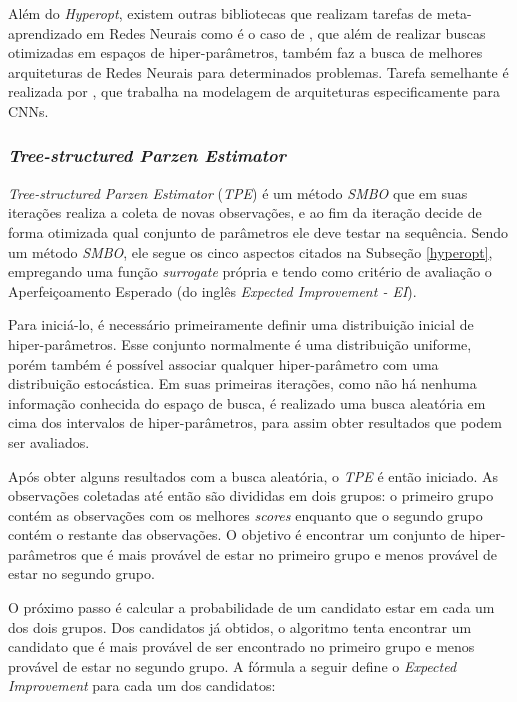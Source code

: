 \documentclass[
12pt,       %
openright,      %
oneside,      %
a4paper,      %
english,      %
french,       %
spanish,      %
brazil        %
]{abntex2}
\begin{document}
Além do \textit{Hyperopt}, existem outras bibliotecas que realizam tarefas de meta-aprendizado em Redes Neurais como é o caso de \cite{NNI}, que além de realizar buscas otimizadas em espaços de hiper-parâmetros, também faz a busca de melhores arquiteturas de Redes Neurais para determinados problemas. Tarefa semelhante é realizada por , que trabalha na modelagem de arquiteturas especificamente para CNNs.

\subsubsection{\textit{Tree-structured Parzen Estimator}} \label{tpe}

\textit{Tree-structured Parzen Estimator} (\textit{TPE}) \cite{bergstra2011algorithms} é um método \textit{SMBO} que em suas iterações realiza a coleta de novas observações, e ao fim da iteração decide de forma otimizada qual conjunto de parâmetros ele deve testar na sequência. Sendo um método \textit{SMBO}, ele segue os cinco aspectos citados na Subseção \ref{hyperopt}, empregando uma função \textit{surrogate} própria e tendo como critério de avaliação o Aperfeiçoamento Esperado (do inglês \textit{Expected Improvement - EI}).

Para iniciá-lo, é necessário primeiramente definir uma distribuição inicial de hiper-parâmetros. Esse conjunto normalmente é uma distribuição uniforme, porém também é possível associar qualquer hiper-parâmetro com uma distribuição estocástica. Em suas primeiras iterações, como não há nenhuma informação conhecida do espaço de busca, é realizado uma busca aleatória em cima dos intervalos de hiper-parâmetros, para assim obter resultados que podem ser avaliados.

Após obter alguns resultados com a busca aleatória, o \textit{TPE} é então iniciado. As observações coletadas até então são divididas em dois grupos: o primeiro grupo contém as observações com os melhores \textit{scores} enquanto que o segundo grupo contém o restante das observações. O objetivo é encontrar um conjunto de hiper-parâmetros que é mais provável de estar no primeiro grupo e menos provável de estar no segundo grupo.

O próximo passo é calcular a probabilidade de um candidato estar em cada um dos dois grupos. Dos candidatos já obtidos, o algoritmo tenta encontrar um candidato que é mais provável de ser encontrado no primeiro grupo e menos provável de estar no segundo grupo. A fórmula a seguir define o \textit{Expected Improvement} para cada um dos candidatos:
\end{document}
